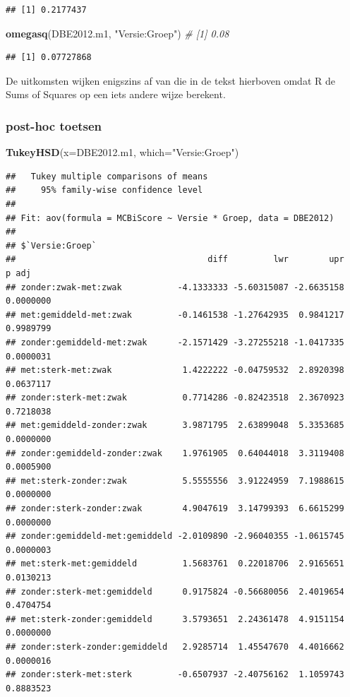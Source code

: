 \documentclass[
]{book}
\newenvironment{Shaded}{\begin{snugshade}}{\end{snugshade}}
\newcommand{\AttributeTok}[1]{\textcolor[rgb]{0.13,0.29,0.53}{#1}}
\newcommand{\CommentTok}[1]{\textcolor[rgb]{0.56,0.35,0.01}{\textit{#1}}}
\newcommand{\FunctionTok}[1]{\textcolor[rgb]{0.13,0.29,0.53}{\textbf{#1}}}
\newcommand{\NormalTok}[1]{#1}
\newcommand{\StringTok}[1]{\textcolor[rgb]{0.31,0.60,0.02}{#1}}
\begin{document}
\begin{verbatim}
## [1] 0.2177437
\end{verbatim}

\begin{Shaded}
\begin{Highlighting}[]
\FunctionTok{omegasq}\NormalTok{(DBE2012.m1, }\StringTok{"Versie:Groep"}\NormalTok{)  }\CommentTok{\# [1] 0.08}
\end{Highlighting}
\end{Shaded}

\begin{verbatim}
## [1] 0.07727868
\end{verbatim}

De uitkomsten wijken enigszins af van die in de tekst hierboven omdat R de Sums of Squares op een iets andere wijze berekent.

\subsubsection{post-hoc toetsen}\label{post-hoc-toetsen}

\begin{Shaded}
\begin{Highlighting}[]
\FunctionTok{TukeyHSD}\NormalTok{(}\AttributeTok{x=}\NormalTok{DBE2012.m1, }\AttributeTok{which=}\StringTok{"Versie:Groep"}\NormalTok{)}
\end{Highlighting}
\end{Shaded}

\begin{verbatim}
##   Tukey multiple comparisons of means
##     95% family-wise confidence level
## 
## Fit: aov(formula = MCBiScore ~ Versie * Groep, data = DBE2012)
## 
## $`Versie:Groep`
##                                      diff         lwr        upr     p adj
## zonder:zwak-met:zwak           -4.1333333 -5.60315087 -2.6635158 0.0000000
## met:gemiddeld-met:zwak         -0.1461538 -1.27642935  0.9841217 0.9989799
## zonder:gemiddeld-met:zwak      -2.1571429 -3.27255218 -1.0417335 0.0000031
## met:sterk-met:zwak              1.4222222 -0.04759532  2.8920398 0.0637117
## zonder:sterk-met:zwak           0.7714286 -0.82423518  2.3670923 0.7218038
## met:gemiddeld-zonder:zwak       3.9871795  2.63899048  5.3353685 0.0000000
## zonder:gemiddeld-zonder:zwak    1.9761905  0.64044018  3.3119408 0.0005900
## met:sterk-zonder:zwak           5.5555556  3.91224959  7.1988615 0.0000000
## zonder:sterk-zonder:zwak        4.9047619  3.14799393  6.6615299 0.0000000
## zonder:gemiddeld-met:gemiddeld -2.0109890 -2.96040355 -1.0615745 0.0000003
## met:sterk-met:gemiddeld         1.5683761  0.22018706  2.9165651 0.0130213
## zonder:sterk-met:gemiddeld      0.9175824 -0.56680056  2.4019654 0.4704754
## met:sterk-zonder:gemiddeld      3.5793651  2.24361478  4.9151154 0.0000000
## zonder:sterk-zonder:gemiddeld   2.9285714  1.45547670  4.4016662 0.0000016
## zonder:sterk-met:sterk         -0.6507937 -2.40756162  1.1059743 0.8883523
\end{verbatim}
\end{document}
